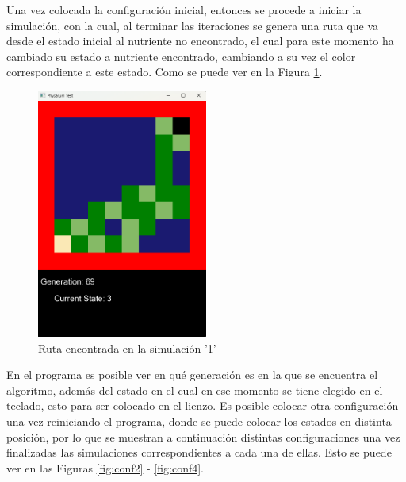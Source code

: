     \vskip 0.5cm
    Una vez colocada la configuraci\'on inicial, entonces se
        procede a iniciar la simulaci\'on, con la cual, al terminar las
        iteraciones se genera una ruta que va desde el estado inicial
        al nutriente no encontrado, el cual para este momento ha
        cambiado su estado a nutriente encontrado, cambiando a su
        vez el color correspondiente a este estado. Como se puede
        ver en la Figura \ref{fig:Rutaencontrada01}.
    \vskip 0.5cm
    \begin{figure}[htbp]
        \centering
        \includegraphics[width=0.5\textwidth]{./images/Pruebas/simulador/image003.png}
        \caption{Ruta encontrada en la simulaci\'on '1'}
        \label{fig:Rutaencontrada01}
    \end{figure}
    \clearpage
    \vskip 0.5cm
    En el programa es posible ver en qu\'e generaci\'on es en la que
        se encuentra el algoritmo, adem\'as del estado en el cual en ese
        momento se tiene elegido en el teclado, esto para ser
        colocado en el lienzo.
    \vskip 0.5cm
    Es posible colocar otra configuraci\'on una vez reiniciando el
        programa, donde se puede colocar los estados en distinta
        posici\'on, por lo que se muestran a continuaci\'on distintas
        configuraciones una vez finalizadas las simulaciones
        correspondientes a cada una de ellas. Esto se puede ver en
        las Figuras \ref{fig:conf2} - \ref{fig:conf4}.

